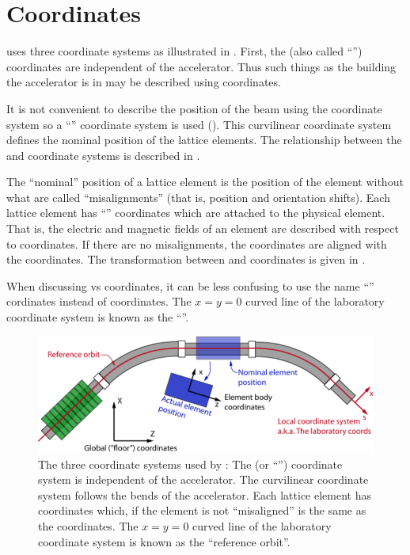 \chapter{Coordinates}
\label{s:coords.3}

\vspace*{-0.3in}
\bmad uses three coordinate systems as illustrated in . First, the  (also
called ``'') coordinates are independent of the accelerator. Thus such things as the
building the accelerator is in may be described using  coordinates.

It is not convenient to describe the position of the beam using the  coordinate system so
a ``'' coordinate system is used ().  This curvilinear coordinate
system defines the nominal position of the lattice elements.  The relationship between the
 and  coordinate systems is described in .

The ``nominal'' position of a lattice element is the position of the element without what are called
``misalignments'' (that is, position and orientation shifts). Each lattice element has ``'' coordinates which are attached to the physical element. That is, the electric and magnetic
fields of an element are described with respect to  coordinates.  If there are no
misalignments, the  coordinates are aligned with the  coordinates. The
transformation between  and  coordinates is given in
.

When discussing  vs  coordinates, it can be less confusing to use the name
``'' cordinates instead of  coordinates. The $x=y=0$ curved line of the
laboratory coordinate system is known as the ``''.

\begin{figure}[!b]
  \centering
  \includegraphics[width=5.0in]{coordinates.pdf}
  \caption[The three coordinate system used by \bmad.]
{The three coordinate systems used by \bmad: The  (or ``'') coordinate system
is independent of the accelerator.  The  curvilinear coordinate system follows the bends
of the accelerator.  Each lattice element has  coordinates which, if the element is
not ``misaligned'' is the same as the  coordinates. The $x=y=0$ curved line of the
laboratory coordinate system is known as the ``reference orbit''.}
  \label{f:coords}
\end{figure}

